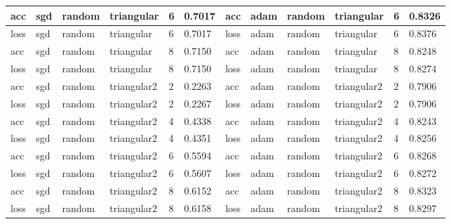 \begin{table}[H]
\begin{adjustbox}{width=1\textwidth}
\begin{tabular}{|l|l|l|l|l|l||l|l|l|l|l|l|}
acc           & sgd          & random        & triangular      & 6             & 0.7017            & acc           & adam         & random        & triangular      & 6             & 0.8326            \\ \hline
loss          & sgd          & random        & triangular      & 6             & 0.7017            & loss          & adam         & random        & triangular      & 6             & 0.8376            \\ \hline
acc           & sgd          & random        & triangular      & 8             & 0.7150            & acc           & adam         & random        & triangular      & 8             & 0.8248            \\ \hline
loss          & sgd          & random        & triangular      & 8             & 0.7150            & loss          & adam         & random        & triangular      & 8             & 0.8274            \\ \hline
acc           & sgd          & random        & triangular2     & 2             & 0.2263            & acc           & adam         & random        & triangular2     & 2             & 0.7906            \\ \hline
loss          & sgd          & random        & triangular2     & 2             & 0.2267            & loss          & adam         & random        & triangular2     & 2             & 0.7906            \\ \hline
acc           & sgd          & random        & triangular2     & 4             & 0.4338            & acc           & adam         & random        & triangular2     & 4             & 0.8243            \\ \hline
loss          & sgd          & random        & triangular2     & 4             & 0.4351            & loss          & adam         & random        & triangular2     & 4             & 0.8256            \\ \hline
acc           & sgd          & random        & triangular2     & 6             & 0.5594            & acc           & adam         & random        & triangular2     & 6             & 0.8268            \\ \hline
loss          & sgd          & random        & triangular2     & 6             & 0.5607            & loss          & adam         & random        & triangular2     & 6             & 0.8272            \\ \hline
acc           & sgd          & random        & triangular2     & 8             & 0.6152            & acc           & adam         & random        & triangular2     & 8             & 0.8323            \\ \hline
loss          & sgd          & random        & triangular2     & 8             & 0.6158            & loss          & adam         & random        & triangular2     & 8             & 0.8297            \\ \hline
\end{tabular}
\end{adjustbox}
\label{t_res_resnet}
\end{table}


